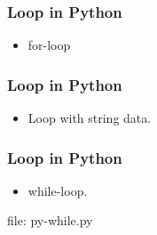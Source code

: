 \begin{frame}[fragile]
\frametitle{Loop in Python}
\begin{itemize}
\item for-loop 

\end{itemize}
\end{frame}

\begin{frame}[fragile]
\frametitle{Loop in Python}
\begin{itemize}
\item Loop with string data.

\end{itemize}
\end{frame}

\begin{frame}[fragile]
\frametitle{Loop in Python}
\newcommand{\newfilename}{py-while.py}

\begin{itemize}
\item while-loop.

\end{itemize}
file: \newfilename
\end{frame}